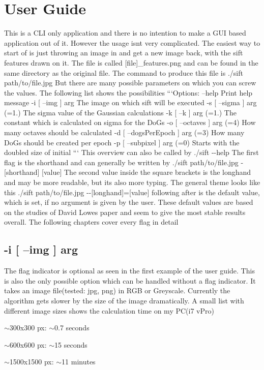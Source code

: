 \section*{User Guide}

This is a C\+L\+I only application and there is no intention to make a G\+U\+I based application out of it. However the usage isn\textquotesingle{}t very complicated. The easiest way to start of is just throwing an image in and get a new image back, with the sift features drawn on it. The file is called {\ttfamily \mbox{[}file\mbox{]}\+\_\+features.\+png} and can be found in the same directory as the original file. The command to produce this file is {\ttfamily ./sift path/to/file.\+jpg} But there are many possible parameters on which you can screw the values. The following list shows the possibilities ```\+Options\+: --help Print help message -\/i \mbox{[} --img \mbox{]} arg The image on which sift will be executed -\/s \mbox{[} --sigma \mbox{]} arg (=1.) The sigma value of the Gaussian calculations -\/k \mbox{[} --k \mbox{]} arg (=1.) The constant which is calculated on sigma for the Do\+Gs -\/o \mbox{[} --octaves \mbox{]} arg (=4) How many octaves should be calculated -\/d \mbox{[} --dogs\+Per\+Epoch \mbox{]} arg (=3) How many Do\+Gs should be created per epoch -\/p \mbox{[} --subpixel \mbox{]} arg (=0) Starts with the doubled size of initial ``` This overview can also be called by {\ttfamily ./sift -\/-\/help} The first flag is the shorthand and can generally be written by {\ttfamily ./sift path/to/file.\+jpg -\/\mbox{[}shorthand\mbox{]} \mbox{[}value\mbox{]}} The second value inside the square brackets is the longhand and may be more readable, but it\textquotesingle{}s also more typing. The general theme looks like this {\ttfamily ./sift path/to/file.\+jpg -\/-\/\mbox{[}longhand\mbox{]}=\mbox{[}value\mbox{]}} following after is the default value, which is set, if no argument is given by the user. These default values are based on the studies of David Lowe\textquotesingle{}s paper and seem to give the most stable results overall. The following chapters cover every flag in detail \subsection*{-\/i \mbox{[} --img \mbox{]} arg}

The flag indicator is optional as seen in the first example of the user guide. This is also the only possible option which can be handled without a flag indicator. It takes an image file(tested\+: jpg, png) in R\+G\+B or Greyscale. Currently the algorithm gets slower by the size of the image dramatically. A small list with different image sizes shows the calculation time on my P\+C(i7 v\+Pro)
\begin{DoxyItemize}
\item $\sim$300x300 px\+: $\sim$0.7 seconds
\item $\sim$600x600 px\+: $\sim$15 seconds
\item $\sim$1500x1500 px\+: $\sim$11 minutes
\end{DoxyItemize}


